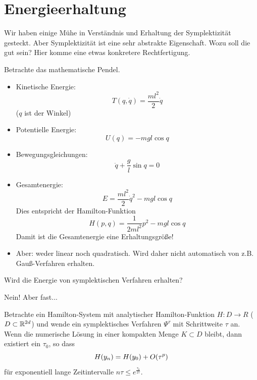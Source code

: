 \section{Energieerhaltung}

Wir haben einige Mühe in Verständnis und Erhaltung der Symplektizität gesteckt.
Aber Symplektizität ist eine sehr abstrakte Eigenschaft. Wozu soll die gut sein? Hier komme eine etwas konkretere Rechtfertigung.

Betrachte das mathematische Pendel.
\begin{itemize}
	\item Kinetische Energie:
	\begin{equation*}
		T(q, \dot q) = \frac{m l^2}{2} \dot q
	\end{equation*}
	($q$ ist der Winkel)
	\item Potentielle Energie:
	\begin{equation*}
		U(q) = -mgl \cos q
	\end{equation*}
	\item Bewegungsgleichungen:
	\begin{equation*}
		\ddot q + \frac gl \sin q = 0
	\end{equation*}
	\item Gesamtenergie:
	\begin{equation*}
		E = \frac{m l^2}2 \dot q^2 - mgl \cos q
	\end{equation*}
	Dies entspricht der Hamilton-Funktion
	\begin{equation*}
		H(p, q) = \frac{1}{2ml^2} p^2 - mgl \cos q
	\end{equation*}
	Damit ist die Gesamtenergie eine Erhaltungsgröße!
	\item Aber: weder linear noch quadratisch.
	Wird daher nicht automatisch von z.B. Gauß-Verfahren erhalten.
\end{itemize}

Wird die Energie von symplektischen Verfahren erhalten?

Nein! Aber fast...

\begin{satz}
	Betrachte ein Hamilton-System mit analytischer Hamilton-Funktion $H: D \to R$ ($D \subset \mathbb R^{2d}$) und wende ein symplektisches Verfahren $\Psi^\tau$ mit Schrittweite $\tau$ an. Wenn die numerische Lösung in einer kompakten Menge $K\subset D$ bleibt, dann existiert ein $\tau_0$, so dass
	\begin{equation*}
		H(y_n) = H(y_0) + O(\tau^p) \vadjust{\todo{$H$ ist nicht ganz konstant, aber die Abweichung ist seeeehr klein - nämlich in $\mathcal{O}(\tau^p)$}}
	\end{equation*}
	für exponentiell lange Zeitintervalle $n\tau \le e^{\frac{\tau_0}{2 \tau}}$.
\end{satz}

